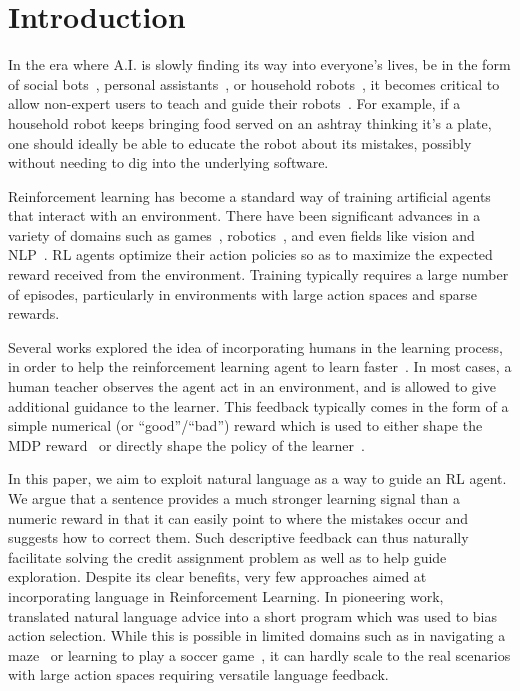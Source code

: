 \vspace{-3.5mm}
\section{Introduction}
\label{sec:intro}


In the era where A.I. is slowly finding its way into everyone's lives, be in the form of social bots~\cite{Vinyals15,tay}, personal assistants~\cite{Mataric17,Westlund16,SimoCVPR15}, or household robots~\cite{herb}, it becomes critical to allow non-expert users to teach and guide their robots~\cite{Weston16,Weston16b}. For example, if a household robot keeps bringing food served on an ashtray thinking it's a plate, one should ideally be able to educate the robot about its mistakes,  possibly without needing to dig into the underlying software. 

Reinforcement learning has become a standard way of training artificial agents that interact with an environment. There have been significant advances in a variety of domains such as games~\cite{Silver_2016,mnih2015humanlevel}, robotics~\cite{Levine:2016}, and even fields like vision and NLP~\cite{Selfcritical,Li16}.
RL agents optimize their action policies so as to maximize the expected reward received from the environment. Training typically requires a large number of episodes, particularly in environments with large action spaces and sparse rewards. 


Several works explored the idea of incorporating humans in the learning process, in order to help the reinforcement learning agent to learn faster~\cite{Thomaz06,Knox12,Knox13,Judah10,shaping}. In most cases, a human teacher observes the agent act in an environment, and is allowed to give additional guidance to the learner. This feedback typically comes in the form of a simple numerical (or ``good''/``bad'')  reward which is used to either shape the MDP reward~\cite{Thomaz06} or directly shape the policy of the learner~\cite{shaping}.  

In this paper, we aim to exploit natural language as a way to guide an RL agent. We argue that a sentence provides a much stronger learning signal than a numeric reward in that it can easily point to where the mistakes occur and suggests how to correct them.  Such descriptive feedback can thus naturally facilitate solving the credit assignment problem as well as to help guide exploration. Despite its clear benefits, very few approaches aimed at incorporating language in Reinforcement Learning. In pioneering work,~\cite{Maclin94} translated natural language advice into a short program which was used to bias action selection. While this is possible in limited domains such as in navigating a maze~\cite{Maclin94} or learning to play a soccer game~\cite{Kuhlmann04}, it can hardly scale to the real scenarios with large action spaces requiring versatile language feedback. 

